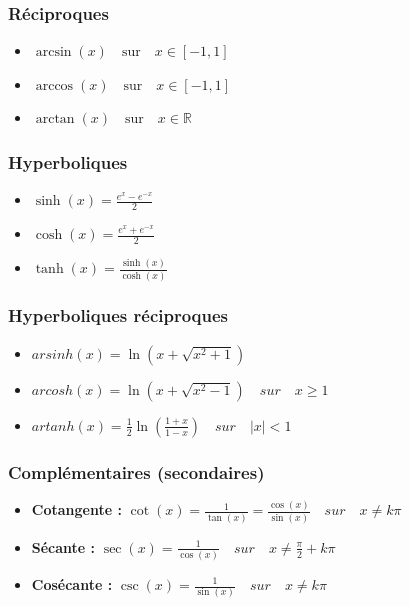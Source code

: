 \documentclass[12]{article}%
\theoremstyle{plain}
\theoremstyle{definition}
\theoremstyle{remark}
\begin{document}
\subsubsection{Réciproques}
\begin{itemize}
	\item \( \boxed{\arcsin(x) \quad \text{sur} \quad x \in [-1,1]} \)
	\item \( \boxed{\arccos(x) \quad \text{sur} \quad x \in [-1,1]} \)
	\item \( \boxed{\arctan(x) \quad \text{sur} \quad x \in \mathbb{R}} \)
\end{itemize}


\subsubsection{Hyperboliques}
\begin{itemize}
	\item \( \boxed{\sinh(x) = \frac{e^{x} - e^{-x}}{2}} \)
	\item \( \boxed{\cosh(x) = \frac{e^{x} + e^{-x}}{2}} \)
	\item \( \boxed{\tanh(x) = \frac{\sinh(x)}{\cosh(x)}} \)
\end{itemize}

\subsubsection{Hyperboliques réciproques}
\begin{itemize}
	\item \( \boxed{arsinh(x) = \ln\left(x + \sqrt{x^2 + 1}\right)} \)
	\item \( \boxed{arcosh(x) = \ln\left(x + \sqrt{x^2 - 1}\right)} \quad sur \quad x \geq 1 \)
	\item \( \boxed{artanh(x) = \frac{1}{2} \ln\left(\frac{1 + x}{1 - x}\right)} \quad sur \quad |x| < 1 \)
\end{itemize}

\subsubsection{Complémentaires (secondaires)}
\begin{itemize}
	\item \textbf{Cotangente :} \( \boxed{\cot(x) = \frac{1}{\tan(x)} = \frac{\cos(x)}{\sin(x)}} \quad sur \quad x \neq k\pi \)
	\item \textbf{Sécante :} \( \boxed{\sec(x) = \frac{1}{\cos(x)}} \quad sur \quad x \neq \frac{\pi}{2} + k\pi \)
	\item \textbf{Cosécante :} \( \boxed{\csc(x) = \frac{1}{\sin(x)}} \quad sur \quad x \neq k\pi \)
\end{itemize}
\end{document}
